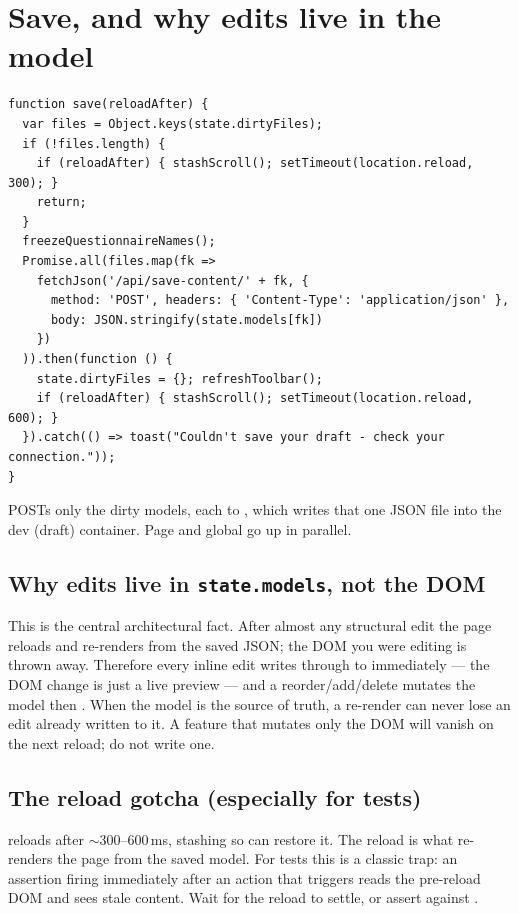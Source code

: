 \documentclass[11pt]{article}
\begin{document}
\section{Save, and why edits live in the model}

\begin{lstlisting}
function save(reloadAfter) {
  var files = Object.keys(state.dirtyFiles);
  if (!files.length) {
    if (reloadAfter) { stashScroll(); setTimeout(location.reload, 300); }
    return;
  }
  freezeQuestionnaireNames();
  Promise.all(files.map(fk =>
    fetchJson('/api/save-content/' + fk, {
      method: 'POST', headers: { 'Content-Type': 'application/json' },
      body: JSON.stringify(state.models[fk])
    })
  )).then(function () {
    state.dirtyFiles = {}; refreshToolbar();
    if (reloadAfter) { stashScroll(); setTimeout(location.reload, 600); }
  }).catch(() => toast("Couldn't save your draft - check your connection."));
}
\end{lstlisting}

 POSTs only the dirty models, each to ,
which writes that one JSON file into the dev (draft) container. Page and global go
up in parallel.

\subsection{Why edits live in \texttt{state.models}, not the DOM}

This is the central architectural fact. After almost any structural edit the page
reloads and re-renders from the saved JSON; the DOM you were editing is thrown
away. Therefore every inline edit writes through to 
immediately --- the DOM change is just a live preview --- and a reorder/add/delete
mutates the model then . When the model is the source of truth, a
re-render can never lose an edit already written to it. A feature that mutates only
the DOM will vanish on the next reload; do not write one.

\subsection{The reload gotcha (especially for tests)}

 reloads after $\sim$300--600\,ms, stashing  so
 can restore it. The reload is what re-renders the page from the saved
model. For tests this is a classic trap: an assertion firing immediately after an
action that triggers  reads the pre-reload DOM and sees stale
content. Wait for the reload to settle, or assert against
.
\end{document}
